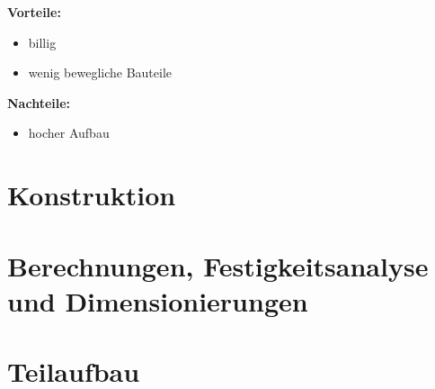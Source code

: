 \textbf{Vorteile:}
\begin{itemize}
    \item billig
    \item wenig bewegliche Bauteile
\end{itemize}
\textbf{Nachteile:}
\begin{itemize}
    \item hocher Aufbau
\end{itemize}

\section{Konstruktion}

\section{Berechnungen, Festigkeitsanalyse und Dimensionierungen}

\section{Teilaufbau}